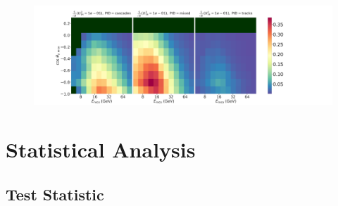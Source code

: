 \begin{figure}
    \includegraphics[trim=7cm 0cm 12cm 1cm, clip]{figures/results/labeled_s_to_sqrt_b_1.0_GeV_combined_U_tau4_sq_0.1000_total.png}
    \caption[]{}
\end{figure}


\section{Statistical Analysis} 

\subsection{Test Statistic}

